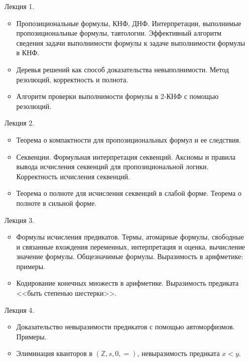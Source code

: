 \begin{enumerate}
    \item[Лекция 1.]
        \begin{itemize}
            \item Пропозициональные формулы, КНФ, ДНФ. Интерпретации, выполнимые пропозициональные
                формулы, тавтологии. Эффективный алгоритм сведения задачи выполнимости формулы к задаче
                выполнимости формулы в КНФ.
            \item Деревья решений как способ доказательства невыполнимости. Метод резолюций, корректность
                и полнота.
            \item Алгоритм проверки выполнимости формулы в 2-КНФ с помощью резолюций.
        \end{itemize}
    \item[Лекция 2.]
        \begin{itemize}
            \item Теорема о компактности для пропозициональных формул и ее следствия. 
            \item Секвенции. Формульная интерпретация секвенций. Аксиомы и правила вывода исчисления
                секвенций для пропозициональной логики. Корректность исчисления секвенций. 
            \item Теорема о полноте для исчисления секвенций в слабой форме. Теорема о полноте в сильной
                форме. 
        \end{itemize}
    \item[Лекция 3.]
        \begin{itemize}
            \item Формулы исчисления предикатов. Термы, атомарные формулы, свободные и связанные
                вхождения переменных, интерпретация и оценка, вычисление значение формулы. Общезначимые
                формулы. Выразимость в арифметике: примеры. 
            \item Кодирование конечных множеств в арифметике.  Выразимость предиката <<быть степенью
                шестерки>>.
        \end{itemize}
    \item[Лекция 4.]
        \begin{itemize}
            \item Доказательство невыразимости предикатов с помощью автоморфизмов. Примеры.
            \item Элиминация кванторов в $(\mathbb{Z}, s, 0, =)$, невыразимость предиката $x < y$.

\end{itemize}
\end{enumerate}
